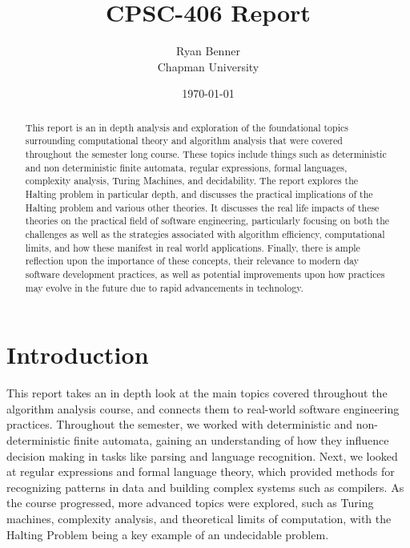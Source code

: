 \documentclass{article}
\title{CPSC-406 Report}
\author{Ryan Benner  \\ Chapman University}
\date{\today}
\theoremstyle{theorem}
\theoremstyle{definition}
\theoremstyle{remark}
\begin{document}
\maketitle

\begin{abstract}
  This report is an in depth analysis and exploration of the foundational topics surrounding computational theory and algorithm analysis that were covered throughout the semester long course. These topics include things such as deterministic and non deterministic finite automata, regular expressions, formal languages, complexity analysis, Turing Machines, and decidability. The report explores the Halting problem in particular depth, and discusses the practical implications of the Halting problem and various other theories. It discusses the real life impacts of these theories on the practical field of software engineering, particularly focusing on both the challenges as well as the strategies associated with algorithm efficiency, computational limits, and how these manifest in real world applications. Finally, there is ample reflection upon the importance of these concepts, their relevance to modern day software development practices, as well as potential improvements upon how practices may evolve in the future due to rapid advancements in technology.
\end{abstract}

\setcounter{tocdepth}{3}
\tableofcontents

\section{Introduction}\label{intro}

This report takes an in depth look at the main topics covered throughout the algorithm analysis course, and connects them to real-world software engineering practices. Throughout the semester, we worked with deterministic and non-deterministic finite automata, gaining an understanding of how they influence decision making in tasks like parsing and language recognition. Next, we looked at regular expressions and formal language theory, which provided methods for recognizing patterns in data and building complex systems such as compilers. As the course progressed, more advanced topics were explored, such as Turing machines, complexity analysis, and theoretical limits of computation, with the Halting Problem being a key example of an undecidable problem.
\end{document}

